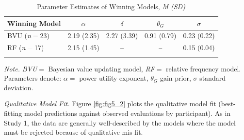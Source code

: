 \documentclass[a4paper, man, floatsintext]{apa6}
\begin{document}
\begin{table}[tbp]

\begin{center}
\begin{threeparttable}

\caption{\label{tab:parameter_study2}Parameter Estimates of Winning Models, \textit{M (SD)}}

\begin{tabular}{lcccc}
\toprule
Winning Model & $\alpha$ & $\delta$ & $\theta_G$ & $\sigma$\\
\midrule
BVU (\textit{n}$=$23) & 2.19 (2.35) & 2.27 (3.39) & 0.91 (0.79) & 0.23 (0.22)\\
RF (\textit{n}$=$17) & 2.15 (1.45) & -- & -- & 0.15 (0.04)\\
\bottomrule
\addlinespace
\end{tabular}

\begin{tablenotes}[para]
\normalsize{\textit{Note.} \textit{BVU}$=$ Bayesian value updating model, \textit{RF}$=$ relative frequency model. Parameters denote: $\alpha=$ power utility exponent, $\theta_G$ gain prior, $\sigma$ standard deviation.}
\end{tablenotes}

\end{threeparttable}
\end{center}

\end{table}

\textit{Qualitative Model Fit.} Figure \ref{fig:fig5_2} plots the
qualitative model fit (best-fitting model predictions against observed
evaluations by participant). As in Study 1, the data are generally
well-described by the models
where the model must be rejected because of qualitative mis-fit.
\end{document}
